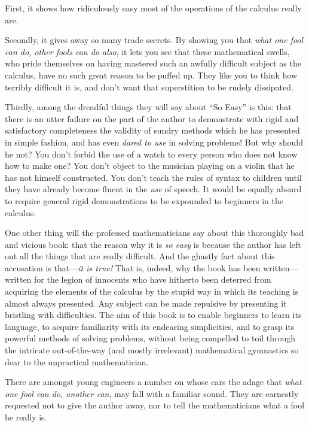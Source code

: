 \documentclass[12pt]{book}[2005/09/16]
\newcommand{\DPPageSep}[2]{\Pagelabel{#2}}
\newcommand{\Pagelabel}[1]
  {\phantomsection\label{#1}}
\begin{document}
First, it shows how ridiculously easy most of the
operations of the calculus really are.

Secondly, it gives away so many trade secrets. By
showing you that \emph{what one fool can do, other fools
can do also}, it lets you see that these mathematical
swells, who pride themselves on having mastered such
an awfully difficult subject as the calculus, have no
such great reason to be puffed up. They like you to
think how terribly difficult it is, and don't want that
superstition to be rudely dissipated.

Thirdly, among the dreadful things they will say
about ``So Easy'' is this: that there is an utter failure
on the part of the author to demonstrate with rigid
\DPPageSep{262.png}{250}%
and satisfactory completeness the validity of sundry
methods which he has presented in simple fashion,
and has even \emph{dared to use} in solving problems! But
why should he not? You don't forbid the use of
a watch to every person who does not know how to
make one? You don't object to the musician playing
on a violin that he has not himself constructed. You
don't teach the rules of syntax to children until they
have already become fluent in the \emph{use} of speech. It
would be equally absurd to require general rigid
demonstrations to be expounded to beginners in the
calculus.

One other thing will the professed mathematicians
say about this thoroughly bad and vicious book: that
the reason why it is \emph{so easy} is because the author has
left out all the things that are really difficult. And
the ghastly fact about this accusation is that---\emph{it
is true!} That is, indeed, why the book has been
written---written for the legion of innocents who have
hitherto been deterred from acquiring the elements of
the calculus by the stupid way in which its teaching
is almost always presented. Any subject can be made
repulsive by presenting it bristling with difficulties.
The aim of this book is to enable beginners to learn
its language, to acquire familiarity with its endearing
simplicities, and to grasp its powerful methods of
solving problems, without being compelled to toil
through the intricate out-of-the-way (and mostly
irrelevant) mathematical gymnastics so dear to the
unpractical mathematician.
\DPPageSep{263.png}{251}%

There are amongst young engineers a number on
whose ears the adage that \emph{what one fool can do,
another can}, may fall with a familiar sound. They
are earnestly requested not to give the author
away, nor to tell the mathematicians what a fool
he really is.
\DPPageSep{264.png}{252}%
\end{document}
